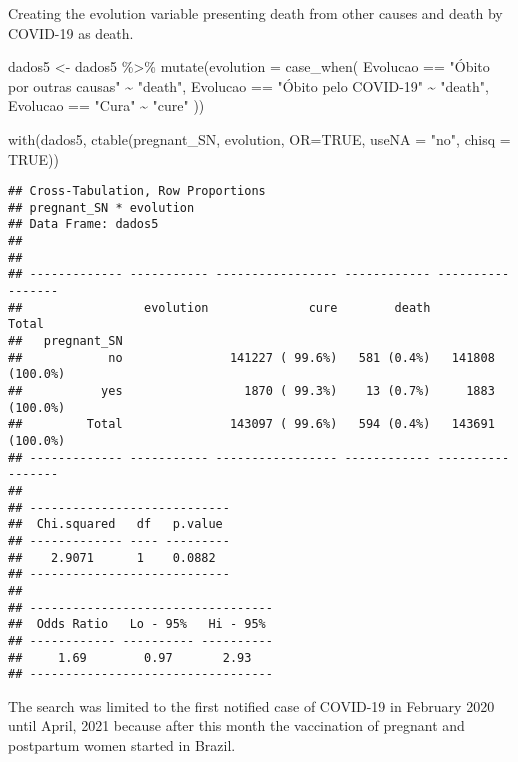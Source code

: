\documentclass[
]{article}
\newenvironment{Shaded}{\begin{snugshade}}{\end{snugshade}}
\newcommand{\AttributeTok}[1]{\textcolor[rgb]{0.77,0.63,0.00}{#1}}
\newcommand{\ConstantTok}[1]{\textcolor[rgb]{0.00,0.00,0.00}{#1}}
\newcommand{\FunctionTok}[1]{\textcolor[rgb]{0.00,0.00,0.00}{#1}}
\newcommand{\NormalTok}[1]{#1}
\newcommand{\OtherTok}[1]{\textcolor[rgb]{0.56,0.35,0.01}{#1}}
\newcommand{\SpecialCharTok}[1]{\textcolor[rgb]{0.00,0.00,0.00}{#1}}
\newcommand{\StringTok}[1]{\textcolor[rgb]{0.31,0.60,0.02}{#1}}
\begin{document}
Creating the evolution variable presenting death from other causes and
death by COVID-19 as death.

\begin{Shaded}
\begin{Highlighting}[]
\NormalTok{dados5 }\OtherTok{\textless{}{-}}\NormalTok{ dados5 }\SpecialCharTok{\%\textgreater{}\%} 
  \FunctionTok{mutate}\NormalTok{(}\AttributeTok{evolution =} \FunctionTok{case\_when}\NormalTok{(}
\NormalTok{    Evolucao }\SpecialCharTok{==} \StringTok{"Óbito por outras causas"} \SpecialCharTok{\textasciitilde{}} \StringTok{"death"}\NormalTok{, }
\NormalTok{    Evolucao }\SpecialCharTok{==} \StringTok{"Óbito pelo COVID{-}19"} \SpecialCharTok{\textasciitilde{}} \StringTok{"death"}\NormalTok{, }
\NormalTok{    Evolucao }\SpecialCharTok{==} \StringTok{"Cura"} \SpecialCharTok{\textasciitilde{}} \StringTok{"cure"}
\NormalTok{  ))}

\FunctionTok{with}\NormalTok{(dados5, }\FunctionTok{ctable}\NormalTok{(pregnant\_SN, evolution, }\AttributeTok{OR=}\ConstantTok{TRUE}\NormalTok{, }\AttributeTok{useNA =} \StringTok{"no"}\NormalTok{, }\AttributeTok{chisq =} \ConstantTok{TRUE}\NormalTok{))}
\end{Highlighting}
\end{Shaded}

\begin{verbatim}
## Cross-Tabulation, Row Proportions  
## pregnant_SN * evolution  
## Data Frame: dados5  
## 
## 
## ------------- ----------- ----------------- ------------ -----------------
##                 evolution              cure        death             Total
##   pregnant_SN                                                             
##            no               141227 ( 99.6%)   581 (0.4%)   141808 (100.0%)
##           yes                 1870 ( 99.3%)    13 (0.7%)     1883 (100.0%)
##         Total               143097 ( 99.6%)   594 (0.4%)   143691 (100.0%)
## ------------- ----------- ----------------- ------------ -----------------
## 
## ----------------------------
##  Chi.squared   df   p.value 
## ------------- ---- ---------
##    2.9071      1    0.0882  
## ----------------------------
## 
## ----------------------------------
##  Odds Ratio   Lo - 95%   Hi - 95% 
## ------------ ---------- ----------
##     1.69        0.97       2.93   
## ----------------------------------
\end{verbatim}

The search was limited to the first notified case of COVID-19 in
February 2020 until April, 2021 because after this month the vaccination
of pregnant and postpartum women started in Brazil.
\end{document}
